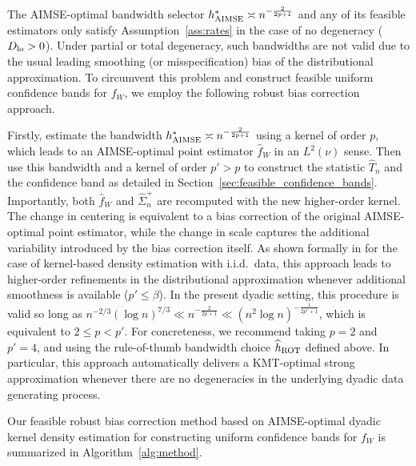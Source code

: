 The AIMSE-optimal bandwidth selector $h^*_{\operatorname{AIMSE}}\asymp n^{-\frac{2}{2p+1}}$
and any of its feasible estimators only satisfy
Assumption~\ref{ass:rates} in the case of no degeneracy ($D_{\textup{lo}}>0$).
Under partial or total degeneracy,
such bandwidths are not valid due to the usual leading
smoothing
(or misspecification) bias of the distributional approximation. To
circumvent this problem and construct feasible uniform confidence bands
for $f_W$, we employ the following robust bias correction approach.

Firstly, estimate the bandwidth $h^*_{\operatorname{AIMSE}}\asymp n^{-\frac{2}{2p+1}}$ using a
kernel of order $p$, which leads to an AIMSE-optimal point estimator
$\widehat{f}_W$ in an $L^2(\nu)$ sense. Then use this bandwidth and a kernel of
order $p' > p$ to construct the statistic $\widehat T_n$ and the confidence band
as detailed in Section~\ref{sec:feasible_confidence_bands}.
Importantly, both $\widehat{f}_W$ and $\widehat{\Sigma}^+_n$ are
recomputed with the new higher-order kernel.
The change in centering is equivalent to a bias correction
of the original AIMSE-optimal point estimator,
while the change in scale captures the additional variability
introduced by the bias correction itself.
As shown formally in
\citet{Calonico-Cattaneo-Farrell_2018_JASA,
  Calonico-Cattaneo-Farrell_2022_Bernoulli}
for the case of kernel-based density estimation with i.i.d.\ data,
this approach leads to higher-order refinements in the distributional
approximation whenever additional smoothness is available ($p'\leq\beta$).
In the present dyadic setting, this procedure is valid so long as
$n^{-2/3} (\log n)^{7/3} \ll n^{-\frac{2}{2p+1}}
\ll (n^2 \log n)^{-\frac{1}{2p' + 1}}$,
which is equivalent to
$2 \leq p < p'$.
For concreteness, we recommend taking
$p = 2$ and $p' = 4$,
and using the rule-of-thumb bandwidth choice $\widehat{h}_{\operatorname{ROT}}$ defined above.
In particular, this approach automatically delivers a KMT-optimal
strong approximation whenever there are no degeneracies in the
underlying dyadic data generating process.

Our feasible robust bias correction method based on AIMSE-optimal dyadic
kernel density estimation for constructing uniform confidence bands
for $f_W$ is summarized in Algorithm~\ref{alg:method}.

